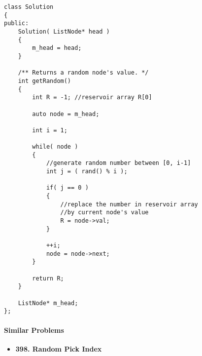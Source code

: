 \setcounter{lstlisting}{0}
\begin{lstlisting}[style=customc, caption={Reservoir Sampling}]
class Solution
{
public:
    Solution( ListNode* head )
    {
        m_head = head;
    }

    /** Returns a random node's value. */
    int getRandom()
    {
        int R = -1; //reservoir array R[0]

        auto node = m_head;

        int i = 1;

        while( node )
        {
            //generate random number between [0, i-1]
            int j = ( rand() % i );

            if( j == 0 )
            {
                //replace the number in reservoir array
                //by current node's value
                R = node->val;
            }

            ++i;
            node = node->next;
        }

        return R;
    }

    ListNode* m_head;
};
\end{lstlisting}

\paragraph{Similar Problems}
\begin{itemize}
\item \textbf{398. Random Pick Index}
\end{itemize}